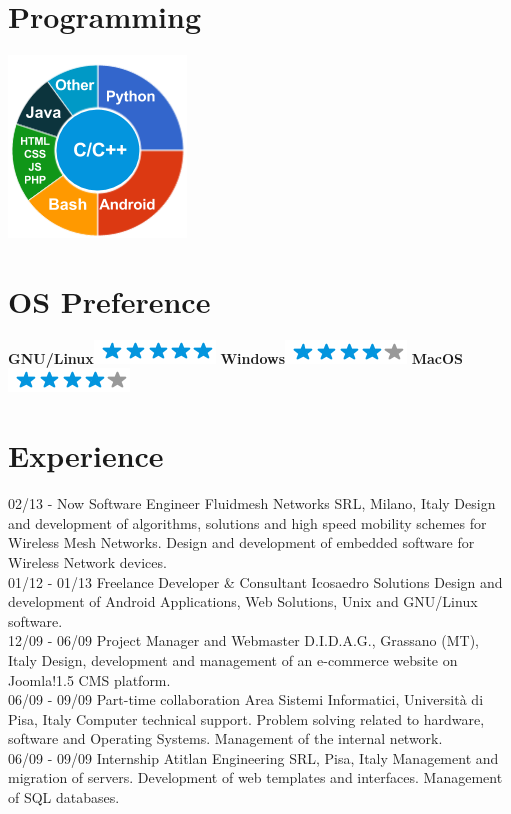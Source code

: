 \documentclass[]{friggeri-cv}
\begin{document}
\begin{aside}
  \section{Programming}
    \includegraphics[scale=0.62]{img/programming.png}
    ~
  \section{OS Preference}
    \textbf{GNU/Linux}\includegraphics[scale=0.40]{img/5stars.png}
    \textbf{Windows}\includegraphics[scale=0.40]{img/4stars.png}
    \textbf{MacOS}\includegraphics[scale=0.40]{img/4stars.png}
    ~
\end{aside}

\section{Experience}
\begin{entrylist}
  \entry
    {02/13 - Now}
    {Software Engineer}
    {Fluidmesh Networks SRL, Milano, Italy}
    {Design and development of algorithms, solutions and high speed mobility           schemes for Wireless Mesh Networks. Design and development of embedded software     for Wireless Network devices.\\}
  \entry
    {01/12 - 01/13}
    {Freelance Developer \& Consultant}
    {Icosaedro Solutions}
    {Design and development of Android Applications, Web Solutions, Unix and GNU/Linux software.\\}
    \entry
    {12/09 - 06/09}
    {Project Manager and Webmaster}
    {D.I.D.A.G., Grassano (MT), Italy}
    {Design, development and management of an e-commerce website on Joomla!1.5 CMS platform.\\}
    \entry
    {06/09 - 09/09}
    {Part-time collaboration}
    {Area Sistemi Informatici, Università di Pisa, Italy}
    {Computer technical support. Problem solving related to hardware, software and Operating Systems. Management of the internal network.\\}
    \entry
    {06/09 - 09/09}
    {Internship}
    {Atitlan Engineering SRL, Pisa, Italy}
    {Management and migration of servers. Development of web templates and interfaces. Management of SQL databases.}
\end{entrylist}
\end{document}

